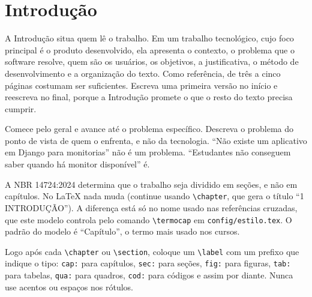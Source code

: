 \chapter{Introdução}
\label{cap:introducao}

\begin{instrucao}
A Introdução situa quem lê o trabalho. Em um trabalho tecnológico, cujo foco principal é
o produto desenvolvido, ela apresenta o contexto, o problema que o software
resolve, quem são os usuários, os objetivos, a justificativa, o método de
desenvolvimento e a organização do texto. Como referência, de três a cinco
páginas costumam ser suficientes. Escreva uma primeira versão no início e
reescreva no final, porque a Introdução promete o que o resto do texto precisa
cumprir.

Comece pelo geral e avance até o problema específico. Descreva o problema do
ponto de vista de quem o enfrenta, e não da tecnologia. ``Não existe um
aplicativo em Django para monitorias'' não é um problema. ``Estudantes não
conseguem saber quando há monitor disponível'' é.

A NBR 14724:2024 determina que o trabalho seja dividido em seções, e não em
capítulos. No LaTeX nada muda (continue usando \verb|\chapter|, que gera o
título ``1 INTRODUÇÃO''). A diferença está só no nome usado nas referências
cruzadas, que este modelo controla pelo comando \verb|\termocap| em
\verb|config/estilo.tex|. O padrão do modelo é ``Capítulo'', o termo mais
usado nos cursos.

Logo após cada \verb|\chapter| ou \verb|\section|, coloque um
\verb|\label| com um prefixo que indique o tipo: \verb|cap:| para capítulos,
\verb|sec:| para seções, \verb|fig:| para figuras, \verb|tab:| para tabelas,
\verb|qua:| para quadros, \verb|cod:| para códigos e assim por diante. Nunca
use acentos ou espaços nos rótulos.
\end{instrucao}

